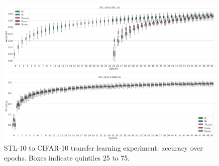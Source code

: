 \begin{figure}[ht!]
\centering
\begin{minipage}[t]{0.42\textwidth}
\begin{center}
\includegraphics[angle=90,origin=c, trim=0in 0in 0in 0in, clip, width=1.00\linewidth]{figures/boxplots/STL-10_to_STL-10_boxplot.png}
\caption{STL-10 in-dataset experiment: accuracy over epochs. 
Boxes indicate quintiles 25 to 75. }
\label{fig:sampling_boxplot_stl_stl}    
\end{center}
\end{minipage}
\hskip 2mm
\begin{minipage}[t]{0.42\textwidth}
\begin{center}
\includegraphics[angle=90,origin=c, trim=0in 0in 0in 0in, clip, width=1.00\linewidth]{figures/boxplots/STL-10_to_CIFAR-10_boxplot.png}
\caption{STL-10 to CIFAR-10 transfer learning experiment: accuracy over epochs. Boxes indicate quintiles 25 to 75.}
\label{fig:sampling_boxplot_stl_cifar}    
\end{center}
\end{minipage}

\end{figure}

